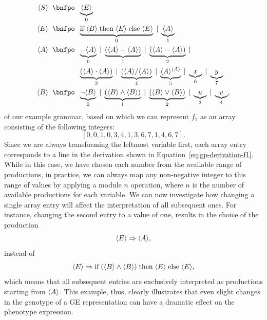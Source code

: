\begin{equation*}
	\begin{split}
		\ps S \; \; \bnfpo & \; \; \underbrace{\ps E}_{0} \\
		\ps E \; \; \bnfpo & \; \; \underbrace{\text{if} \; \ps B \; \text{then} \; \ps E \; \text{else} \; \ps E}_{0} \; | \; \underbrace{\ps A}_{1} \\
		\ps A \; \; \bnfpo & \; \; \underbrace{-\ps A}_0 \; | \; \underbrace{(\ps A + \ps A)}_{1} \; | \; \underbrace{(\ps A - \ps A)}_2 \; |   \\  
		&  \; \; \underbrace{(\ps A \cdot \ps A)}_{3} \; | \; \underbrace{(\ps A / \ps A)}_{4} \; | \; \underbrace{\ps{A}^{\ps A}}_{5} \; | \; \underbrace{x}_{6} \; | \; \underbrace{y}_{7} \\
		\ps B \; \; \bnfpo & \; \; \underbrace{\neg \ps B}_{0} \; | \; \underbrace{(\ps B \wedge \ps B)}_{1} \; | \; \underbrace{(\ps B \vee \ps B)}_{2} \; | \; \underbrace{u}_3 \; | \; \underbrace{v}_4,
	\end{split}
	\label{eq:gp-example-grammar-ge-encoding}
\end{equation*}
of our example grammar, based on which we can represent $f_1$ as an array consisting of the following integers:
\begin{equation*}
	\left[ 0, 0, 1, 0, 3, 4, 1, 3, 6, 7, 1, 4, 6, 7 \right].
\end{equation*}
Since we are always transforming the leftmost variable first, each array entry corresponds to a line in the derivation shown in Equation~\eqref{eq:gp-derivation-f1}.
While in this case, we have chosen each number from the available range of productions, in practice, we can always map any non-negative integer to this range of values by applying a module $n$ operation, where $n$ is the number of available productions for each variable.
We can now investigate how changing a single array entry will affect the interpretation of all subsequent ones.
For instance, changing the second entry to a value of one, results in the choice of the production 
\begin{equation*}
	\langle E \rangle \Rightarrow \langle A \rangle,
\end{equation*}
instead of 
\begin{equation*}
	\langle E \rangle \Rightarrow \text{if} \; (\langle B \rangle \wedge \langle B \rangle) \; \text{then} \; \langle E \rangle \; \text{else} \; \langle E \rangle,
\end{equation*}
which means that all subsequent entries are exclusively interpreted as productions starting from $\langle A \rangle$.
This example, thus, clearly illustrates that even slight changes in the genotype of a GE representation can have a dramatic effect on the phenotype expression.
